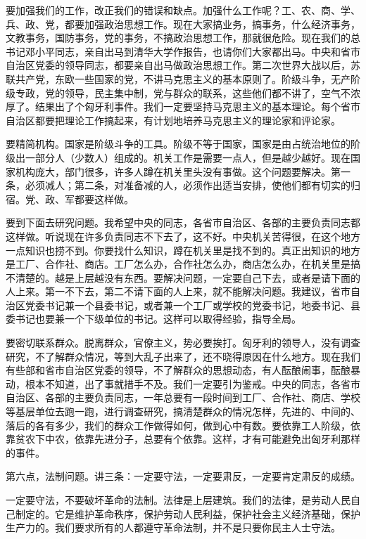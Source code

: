 要加强我们的工作，改正我们的错误和缺点。加强什么工作呢？工、农、商、学、兵、政、党，都要加强政治思想工作。现在大家搞业务，搞事务，什么经济事务，文教事务，国防事务，党的事务，不搞政治思想工作，那就很危险。现在我们的总书记邓小平同志，亲自出马到清华大学作报告，也请你们大家都出马。中央和省市自治区党委的领导同志，都要亲自出马做政治思想工作。第二次世界大战以后，苏联共产党，东欧一些国家的党，不讲马克思主义的基本原则了。阶级斗争，无产阶级专政，党的领导，民主集中制，党与群众的联系，这些他们都不讲了，空气不浓厚了。结果出了个匈牙利事件。我们一定要坚持马克思主义的基本理论。每个省市自治区都要把理论工作搞起来，有计划地培养马克思主义的理论家和评论家。

要精简机构。国家是阶级斗争的工具。阶级不等于国家，国家是由占统治地位的阶级出一部分人（少数人）组成的。机关工作是需要一点人，但是越少越好。现在国家机构庞大，部门很多，许多人蹲在机关里头没有事做。这个问题要解决。第一条，必须减人；第二条，对准备减的人，必须作出适当安排，使他们都有切实的归宿。党、政、军都要这样做。

要到下面去研究问题。我希望中央的同志，各省市自治区、各部的主要负责同志都这样做。听说现在许多负责同志不下去了，这不好。中央机关苦得很，在这个地方一点知识也捞不到。你要找什么知识，蹲在机关里是找不到的。真正出知识的地方是工厂、合作社、商店。工厂怎么办，合作社怎么办，商店怎么办，在机关里是搞不清楚的。越是上层越没有东西。要解决问题，一定要自己下去，或者是请下面的人上来。第一不下去，第二不请下面的人上来，就不能解决问题。我建议，省市自治区党委书记兼一个县委书记，或者兼一个工厂或学校的党委书记，地委书记、县委书记也要兼一个下级单位的书记。这样可以取得经验，指导全局。

要密切联系群众。脱离群众，官僚主义，势必要挨打。匈牙利的领导人，没有调查研究，不了解群众情况，等到大乱子出来了，还不晓得原因在什么地方。现在我们有些部和省市自治区党委的领导，不了解群众的思想动态，有人酝酿闹事，酝酿暴动，根本不知道，出了事就措手不及。我们一定要引为鉴戒。中央的同志，各省市自治区、各部的主要负责同志，一年总要有一段时间到工厂、合作社、商店、学校等基层单位去跑一跑，进行调查研究，搞清楚群众的情况怎样，先进的、中间的、落后的各有多少，我们的群众工作做得如何，做到心中有数。要依靠工人阶级，依靠贫农下中农，依靠先进分子，总要有个依靠。这样，才有可能避免出匈牙利那样的事件。

第六点，法制问题。讲三条：一定要守法，一定要肃反，一定要肯定肃反的成绩。

一定要守法，不要破坏革命的法制。法律是上层建筑。我们的法律，是劳动人民自己制定的。它是维护革命秩序，保护劳动人民利益，保护社会主义经济基础，保护生产力的。我们要求所有的人都遵守革命法制，并不是只要你民主人士守法。

